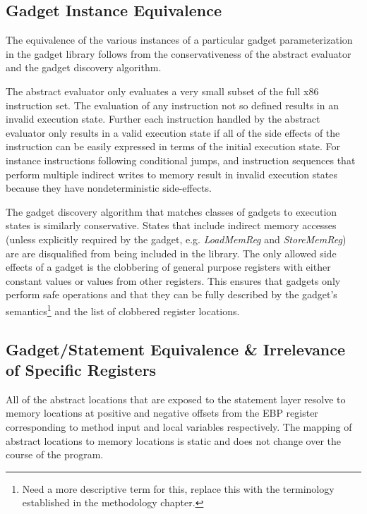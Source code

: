 \documentclass[finalcopy,short]{srpaper}
\begin{document}
        \subsection{Gadget Instance Equivalence}
        \label{sec:results-gadget-inst-eq}
            
            The equivalence of the various instances of a particular gadget
            parameterization in the gadget library follows from the
            conservativeness of the abstract evaluator and the gadget discovery
            algorithm.

            The abstract evaluator only evaluates a very small subset of the
            full x86 instruction set. The evaluation of any instruction not so
            defined results in an invalid execution state. Further each
            instruction handled by the abstract evaluator only results in a
            valid execution state if all of the side effects of the instruction
            can be easily expressed in terms of the initial execution state.
            For instance instructions following conditional jumps, and
            instruction sequences that perform multiple indirect writes to
            memory result in invalid execution states because they have
            nondeterministic side-effects.

            The gadget discovery algorithm that matches classes of gadgets to
            execution states is similarly conservative. States that include
            indirect memory accesses (unless explicitly required by the gadget,
            e.g. \emph{LoadMemReg} and \emph{StoreMemReg}) are are disqualified
            from being included in the library. The only allowed side effects of
            a gadget is the clobbering of general purpose registers with either
            constant values or values from other registers. This ensures that
            gadgets only perform safe operations and that they can be fully
            described by the gadget's semantics\footnote{Need a more descriptive
            term for this, replace this with the terminology established in the
            methodology chapter.} and the list of clobbered register locations.

        \subsection{Gadget/Statement Equivalence \& Irrelevance of Specific Registers}

            All of the abstract locations that are exposed to the statement
            layer resolve to memory locations at positive and negative offsets
            from the EBP register corresponding to method input and local
            variables respectively. The mapping of abstract locations to memory
            locations is static and does not change over the course of the
            program.
\end{document}
